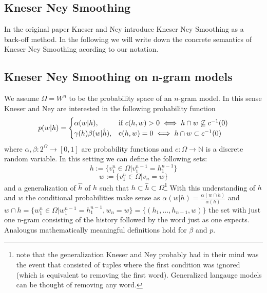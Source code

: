 \documentclass[•]{book}
\begin{document}
\begin{appendix}
\chapter{Kneser Ney Smoothing}
In the original paper Kneser and Ney introduce Kneser Ney Smoothing as a back-off method. 
In the following we will write down the concrete semantics of Kneser Ney Smoothing acording to our notation. 
\section{Kneser Ney Smoothing on n-gram models}
We assume $\Omega=W^n$ to be the probability space of an $n$-gram model. 
In this sense Kneser and Ney are interested in the following probability function
\[
p(w|h)=
\begin{cases}
  \alpha(w|h),&\text{if } c(h,w)>0 \iff h\cap w\not\subseteq c^{-1}(0)\\
  \gamma(h)\beta(w|\hat h), &\text c(h,w)=0 \iff h\cap w\subset c^{-1}(0)
\end{cases}
\]
where $\alpha,\beta: 2^\Omega \rightarrow [0,1]$ are probability functions and $c:\Omega\rightarrow \mathbb{N}$ is a discrete random variable. 
In this setting we can define the following sets:
\[
h:=\{v_1^n\in\Omega|v_1^{n-1}=h_1^{n-1}\}
\]
\[
w:=\{v_1^n\in\Omega|v_n=w\}
\]
and a generalization of $\hat h$ of $h$ such that $h\subset\hat h\subset\Omega$\footnote{note that the generalization Kneser and Ney probably had in their mind was the event that consisted of tuples where the first condition was ignored (which is equivalent to removing the first word). Generalized langauge models can be thought of removing any word.}
With this understanding of $h$ and $w$ the conditional probabilities make sense as $\alpha(w|h)=\frac{\alpha(w \cap h)}{\alpha(h)}$ and $w\cap h=\{w_1^n\in \Omega | w_1^{n-1}=h_1^{n-1}, w_n=w\} = \{(h_1,\dots,h_{n-1},w)\}$ the set with just one n-gram consisting of the history followed by the word just as one expects.
Analougus mathematically meaningful definitions hold for $\beta$ and $p$.


\end{appendix}
\end{document}

